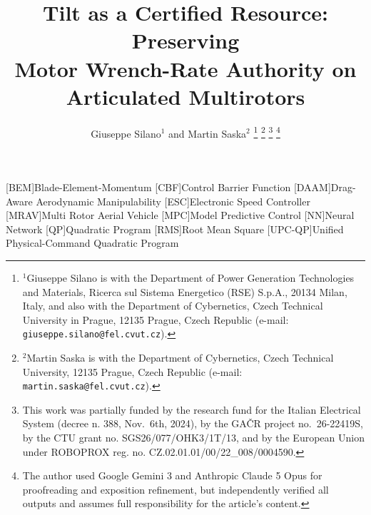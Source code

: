 \documentclass[letter, 10 pt, journal, twoside]{IEEEtran}
\theoremstyle{compact}
\newcommand\copyrighttext{%
    \small \begin{center} \color{red} \textcopyright\,2026 IEEE. This is the author's version of an article accepted for publication in ``2027 IEEE International Conference on Robotics \& Automation''. Personal use of this material is permitted. Permission from IEEE must be obtained for all other uses, in any current or future media, including reprinting/republishing this material for advertising or promotional purposes, creating new collective works, for resale or redistribution to servers or lists, or reuse of any copyrighted component of this work in other works. The final published version is available at [DOI link]\end{center}}
\newcommand\copyrightnotice{%
	\begin{tikzpicture}[remember picture,overlay]
	\node[anchor=south,yshift=25.6cm] at (current page.south) 
	{\color{red}\fbox{\parbox{\dimexpr\textwidth-\fboxsep-\fboxrule\relax}{\copyrighttext}}};
	\end{tikzpicture}%
}
\begin{document}
\title{\LARGE \bf Tilt as a Certified Resource: Preserving\\ Motor Wrench-Rate Authority on Articulated Multirotors}

\author{Giuseppe Silano$^{1}$ and Martin Saska$^{2}$ 
    \thanks{$^1$Giuseppe Silano is with the Department of Power Generation Technologies and Materials, Ricerca sul Sistema Energetico (RSE) S.p.A., 20134 Milan, Italy, and also with the Department of Cybernetics, Czech Technical University in Prague, 12135 Prague, Czech Republic (e-mail: {\tt\small giuseppe.silano@fel.cvut.cz}).}
    \thanks{$^2$Martin Saska is with the Department of Cybernetics, Czech Technical University, 12135 Prague, Czech Republic (e-mail: {\tt\small martin.saska@fel.cvut.cz}).} 
    \thanks{This work was partially funded by the research fund for the Italian Electrical System (decree n. 388, Nov.~6th, 2024), by the GAČR project no.~26-22419S, by the CTU grant no. SGS26/077/OHK3/1T/13, and by the European Union under ROBOPROX reg. no. CZ.02.01.01/00/22\_008/0004590.}
    \thanks{The author used Google Gemini 3 and Anthropic Claude 5 Opus for proofreading and exposition refinement, but independently verified all outputs and assumes full responsibility for the article's content.}
}

\maketitle
\thispagestyle{empty} %
\pagestyle{empty} %


\begin{acronym}
    [BEM]{Blade-Element-Momentum}
    [CBF]{Control Barrier Function}
    [DAAM]{Drag-Aware Aerodynamic Manipulability}
    [ESC]{Electronic Speed Controller}
    [MRAV]{Multi Rotor Aerial Vehicle}
    [MPC]{Model Predictive Control}
    [NN]{Neural Network}
    [QP]{Quadratic Program}
    [RMS]{Root Mean Square}
    [UPC-QP]{Unified Physical-Command Quadratic Program}
\end{acronym}
\end{document}

